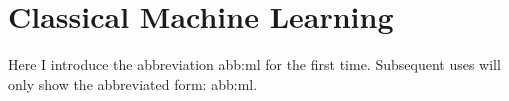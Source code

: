 \section{Classical Machine Learning}\label{sec:ml:classical}

Here I introduce the abbreviation \gls{abb:ml} for the first time.
Subsequent uses will only show the abbreviated form: \gls{abb:ml}.